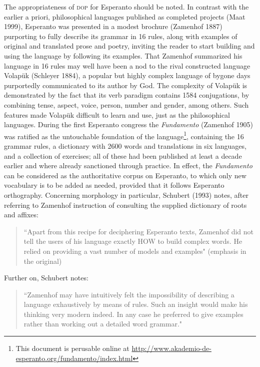 \documentclass[10pt,a4paper]{article}
\begin{document}
The appropriateness of \textsc{dop} for Esperanto should be noted. In contrast with the
earlier a priori, philosophical languages published as completed projects
(Maat 1999), Esperanto was presented in a modest brochure (Zamenhof 1887)
purporting to fully describe its grammar in 16 rules, along with examples of
original and translated prose and poetry, inviting the reader to start
building and using the language by following its examples. That Zamenhof
summarized his language in 16 rules may well have been a nod to the rival
constructed language Volap\"uk (Schleyer 1884), a popular but highly complex
language of bygone days purportedly communicated to its author by God.  The
complexity of Volap\"uk is demonstrated by the fact that its verb paradigm
contains 1584 conjugations, by combining tense, aspect, voice, person, number
and gender, among others. Such features made Volap\"uk difficult to learn and
use, just as the philosophical languages. During the first Esperanto congress
the {\em Fundamento} (Zamenhof 1905) was ratified as the untouchable foundation
of the language\footnote{This document is perusable online at
\url{http://www.akademio-de-esperanto.org/fundamento/index.html}}, containing
the 16 grammar rules, a dictionary with 2600 words and translations in six
languages, and a collection of
exercises; all of these had been published at least a decade earlier and where
already sanctioned through practice. In effect, the {\em Fundamento} can be
considered as the authoritative corpus on Esperanto, to which only new
vocabulary is to be added as needed, provided that it follows Esperanto orthography.
Concerning morphology in particular, Schubert (1993) notes, after referring to
Zamenhof instruction of consulting the supplied dictionary of roots and
affixes:

\begin{quote}
	``Apart from this recipe for deciphering Esperanto texts,
	Zamenhof did not tell the users of his language exactly HOW to
	build complex words. He relied on providing a vast number of models and
	examples" (emphasis in the original)
\end{quote}

Further on, Schubert notes:

\begin{quote}
	``Zamenhof may have intuitively felt the impossibility of describing a
	language exhaustively by means of rules. Such an insight would make his
	thinking very modern indeed. In any case he preferred to give examples
	rather than working out a detailed word grammar."
\end{quote}
\end{document}
